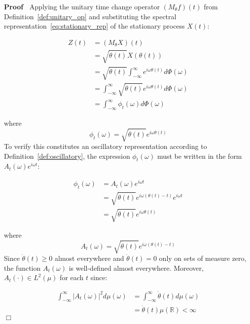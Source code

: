 \documentclass{article}
\newcommand{\cdummy}{\cdot}
\newenvironment{proof}{\noindent\textbf{Proof\ }}{\hspace*{\fill}$\Box$\medskip}
\begin{document}
\begin{proof}
  Applying the unitary time change operator $(M_{\theta} f) (t)$ from
  Definition~\ref{def:unitary_op} and substituting the spectral
  representation~\eqref{eq:stationary_rep} of the stationary process $X (t)$:
  
  \begin{align}
    Z (t) & = (M_{\theta} X) (t) \\
    & = \sqrt{\dot{\theta} (t)} X (\theta (t)) \\
    & = \sqrt{\dot{\theta} (t)}  \int_{- \infty}^{\infty} e^{i \omega \theta
    (t)} d \Phi (\omega) \\
    & = \int_{- \infty}^{\infty} \sqrt{\dot{\theta} (t)} e^{i \omega \theta
    (t)} d \Phi (\omega) \\
    & = \int_{- \infty}^{\infty} \phi_t (\omega) d \Phi (\omega) 
  \end{align}
  
  where
  \begin{equation}
    \phi_t (\omega) = \sqrt{\dot{\theta} (t)} e^{i \omega \theta (t)}
  \end{equation}
  To verify this constitutes an oscillatory representation according to
  Definition~\ref{def:oscillatory}, the expression $\phi_t (\omega)$ must be
  written in the form $A_t (\omega) e^{i \omega t}$:
  
  \begin{align}
    \phi_t (\omega) & = A_t (\omega) e^{i \omega t} \\
    & = \sqrt{\dot{\theta} (t)} e^{i \omega (\theta (t) - t)} e^{i \omega t}
    \\
    & = \sqrt{\dot{\theta} (t)} e^{i \omega \theta (t)} 
  \end{align}
  
  where
  \begin{equation}
    A_t (\omega) = \sqrt{\dot{\theta} (t)} e^{i \omega (\theta (t) - t)}
  \end{equation}
  Since $\dot{\theta} (t) \geq 0$ almost everywhere and $\dot{\theta} (t) = 0$
  only on sets of measure zero, the function $A_t (\omega)$ is well-defined
  almost everywhere. Moreover, $A_t (\cdummy) \in L^2 (\mu)$ for each $t$
  since:
  
  \begin{align}
    \int_{- \infty}^{\infty} |A_t (\omega) |^2 d \mu (\omega) & = \int_{-
    \infty}^{\infty} \dot{\theta} (t) d \mu (\omega) \\
    & = \dot{\theta} (t) \mu (\mathbb{R}) < \infty 
  \end{align}
\end{proof}
\end{document}

